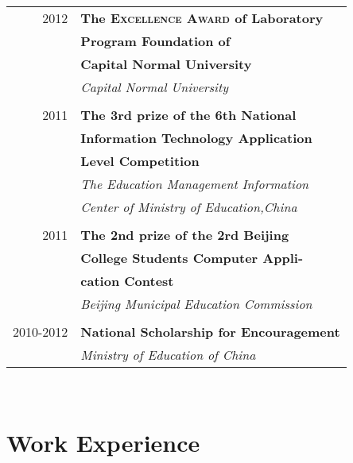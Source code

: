\documentclass[10pt]{article} %
\begin{document}
\begin{minipage}[t]{0.44\textwidth}
\begin{tabular}{rl}
2012	 & \small\textbf{The \textsc{Excellence Award} of Laboratory }\\
& \small\textbf{ Program Foundation of  }\\
& \small\textbf{ Capital Normal University}\\
& \small\textit{Capital Normal University}\\ \\

2011	 & \small\textbf{The 3rd prize of the 6th National} \\
& \small\textbf{ Information Technology Application }\\
& \small\textbf{ Level Competition}\\
& \small\textit{The Education Management Information}\\
& \small\textit{ Center of Ministry of Education,China}\\ \\

2011	 & \small\textbf{The 2nd prize of the 2rd Beijing}\\
& \small\textbf{ College Students Computer Appli-}\\
& \small\textbf{ cation Contest}\\
& \small\textit{Beijing Municipal Education Commission}\\ \\

2010-2012	 & \small\textbf{National Scholarship for Encouragement}\\
& \small\textit{Ministry of Education of China}

\end{tabular}\\[0pt]


\section{Work Experience}


\end{minipage}
\end{document}
